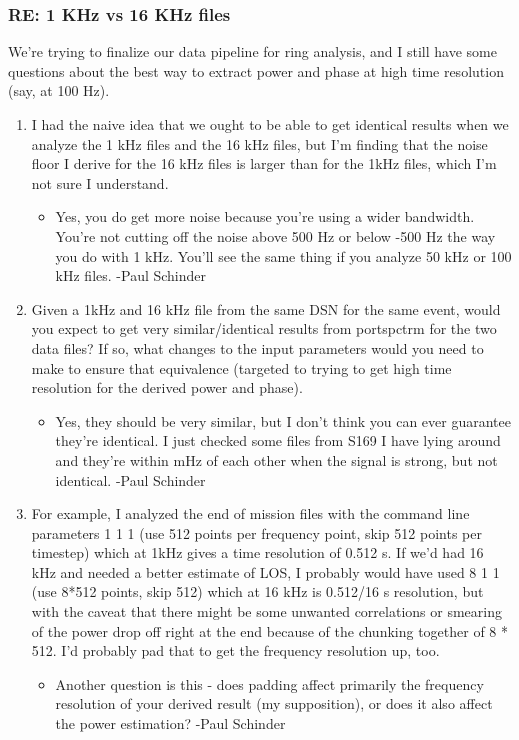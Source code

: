 \documentclass[crop=false,class=article,oneside]{standalone}
\begin{document}
\subsubsection{\footnotesize RE: 1 KHz vs 16 KHz files}
We're trying to finalize our data pipeline for ring analysis, and I still have some questions about the best way to extract power and phase at high time resolution (say, at 100 Hz). 
\begin{enumerate}
    \item I had the naive idea that we ought to be able to get identical results when we analyze the 1 kHz files and the 16 kHz files, but I'm finding that the noise floor I derive for the 16 kHz files is larger than for the 1kHz files, which I'm not sure I understand. 
    \begin{itemize}
        \item Yes, you do get more noise because you’re using a wider bandwidth.  You’re not cutting off the noise above 500 Hz or below -500 Hz the way you do with 1 kHz.  You’ll see the same thing if you analyze 50 kHz or 100 kHz files. -Paul Schinder
    \end{itemize}
    \item Given a 1kHz and 16 kHz file from the same DSN for the same event, would you expect to get very similar/identical results from portspctrm for the two data files? If so, what changes to the input parameters would you need to make to ensure that equivalence (targeted to trying to get high time resolution for the derived power and phase).
    \begin{itemize}
        \item Yes, they should be very similar, but I don’t think you can ever guarantee they’re identical.  I just checked some files from S169 I have lying around and they’re within  mHz of each other when the signal is strong, but not identical. -Paul Schinder
    \end{itemize}
    \item For example, I analyzed the end of mission files with the command line parameters 1 1 1 (use 512 points per frequency point, skip 512 points per timestep) which at 1kHz gives a time resolution of 0.512 s.  If  we’d had 16 kHz and needed a better estimate of LOS, I probably would have used 8 1 1 (use 8*512 points, skip 512) which at 16 kHz is 0.512/16 s resolution, but with the caveat that there might be some unwanted correlations or smearing of the power drop off right at the end because of the chunking together of 8 * 512.  I’d probably pad that to get the frequency resolution up, too.
    \begin{itemize}
        \item Another question is this - does padding affect primarily the frequency resolution of your derived result (my supposition), or does it also affect the power estimation? -Paul Schinder
    \end{itemize}
\end{enumerate}
\end{document}
